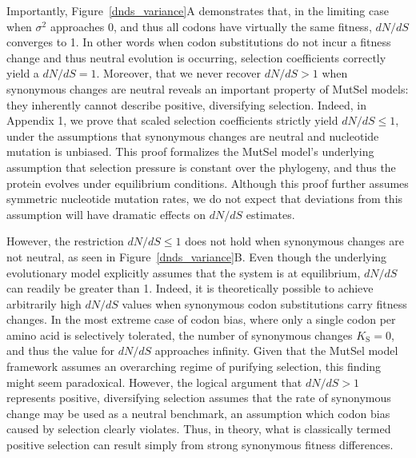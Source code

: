 \documentclass[11pt]{article}
\begin{document}
Importantly, Figure~\ref{dnds_variance}A demonstrates that, in the limiting case when $\sigma^2$ approaches 0, and thus all codons have virtually the same fitness, $dN/dS$ converges to 1. In other words when codon substitutions do not incur a fitness change and thus neutral evolution is occurring, selection coefficients correctly yield a $dN/dS = 1$. Moreover, that we never recover $dN/dS > 1$ when synonymous changes are neutral reveals an important property of MutSel models: they inherently cannot describe positive, diversifying selection. Indeed, in Appendix 1, we prove that scaled selection coefficients strictly yield $dN/dS \leq 1$, under the assumptions that synonymous changes are neutral and nucleotide mutation is unbiased. This proof formalizes the MutSel model's underlying assumption that selection pressure is constant over the phylogeny, and thus the protein evolves under equilibrium conditions. Although this proof further assumes symmetric nucleotide mutation rates, we do not expect that deviations from this assumption will have dramatic effects on $dN/dS$ estimates. 

However, the restriction $dN/dS \leq 1$ does not hold when synonymous changes are not neutral, as seen in Figure~\ref{dnds_variance}B. Even though the underlying evolutionary model explicitly assumes that the system is at equilibrium, $dN/dS$ can readily be greater than 1. Indeed, it is theoretically possible to achieve arbitrarily high $dN/dS$ values when synonymous codon substitutions carry fitness changes. In the most extreme case of codon bias, where only a single codon per amino acid is selectively tolerated, the number of synonymous changes $K_\text{S} = 0$, and thus the value for $dN/dS$ approaches infinity. Given that the MutSel model framework assumes an overarching regime of purifying selection, this finding might seem paradoxical. However, the logical argument that $dN/dS > 1$ represents positive, diversifying selection assumes that the rate of synonymous change may be used as a neutral benchmark, an assumption which codon bias caused by selection clearly violates. Thus, in theory, what is classically termed positive selection can result simply from strong synonymous fitness differences. 	
		
\end{document}
